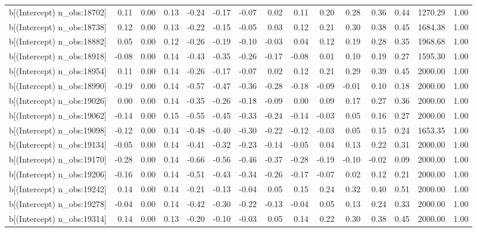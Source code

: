 \begin{table}[ht]
\begin{tabular}{rrrrrrrrrrrrrrr}
  b[(Intercept) n\_obs:18702] & 0.11 & 0.00 & 0.13 & -0.24 & -0.17 & -0.07 & 0.02 & 0.11 & 0.20 & 0.28 & 0.36 & 0.44 & 1270.29 & 1.00 \\ 
  b[(Intercept) n\_obs:18738] & 0.12 & 0.00 & 0.13 & -0.22 & -0.15 & -0.05 & 0.03 & 0.12 & 0.21 & 0.30 & 0.38 & 0.45 & 1684.38 & 1.00 \\ 
  b[(Intercept) n\_obs:18882] & 0.05 & 0.00 & 0.12 & -0.26 & -0.19 & -0.10 & -0.03 & 0.04 & 0.12 & 0.19 & 0.28 & 0.35 & 1968.68 & 1.00 \\ 
  b[(Intercept) n\_obs:18918] & -0.08 & 0.00 & 0.14 & -0.43 & -0.35 & -0.26 & -0.17 & -0.08 & 0.01 & 0.10 & 0.19 & 0.27 & 1595.30 & 1.00 \\ 
  b[(Intercept) n\_obs:18954] & 0.11 & 0.00 & 0.14 & -0.26 & -0.17 & -0.07 & 0.02 & 0.12 & 0.21 & 0.29 & 0.39 & 0.45 & 2000.00 & 1.00 \\ 
  b[(Intercept) n\_obs:18990] & -0.19 & 0.00 & 0.14 & -0.57 & -0.47 & -0.36 & -0.28 & -0.18 & -0.09 & -0.01 & 0.10 & 0.18 & 2000.00 & 1.00 \\ 
  b[(Intercept) n\_obs:19026] & 0.00 & 0.00 & 0.14 & -0.35 & -0.26 & -0.18 & -0.09 & 0.00 & 0.09 & 0.17 & 0.27 & 0.36 & 2000.00 & 1.00 \\ 
  b[(Intercept) n\_obs:19062] & -0.14 & 0.00 & 0.15 & -0.55 & -0.45 & -0.33 & -0.24 & -0.14 & -0.03 & 0.05 & 0.16 & 0.27 & 2000.00 & 1.00 \\ 
  b[(Intercept) n\_obs:19098] & -0.12 & 0.00 & 0.14 & -0.48 & -0.40 & -0.30 & -0.22 & -0.12 & -0.03 & 0.05 & 0.15 & 0.24 & 1653.35 & 1.00 \\ 
  b[(Intercept) n\_obs:19134] & -0.05 & 0.00 & 0.14 & -0.41 & -0.32 & -0.23 & -0.14 & -0.05 & 0.04 & 0.13 & 0.22 & 0.31 & 2000.00 & 1.00 \\ 
  b[(Intercept) n\_obs:19170] & -0.28 & 0.00 & 0.14 & -0.66 & -0.56 & -0.46 & -0.37 & -0.28 & -0.19 & -0.10 & -0.02 & 0.09 & 2000.00 & 1.00 \\ 
  b[(Intercept) n\_obs:19206] & -0.16 & 0.00 & 0.14 & -0.51 & -0.43 & -0.34 & -0.26 & -0.17 & -0.07 & 0.02 & 0.12 & 0.21 & 2000.00 & 1.00 \\ 
  b[(Intercept) n\_obs:19242] & 0.14 & 0.00 & 0.14 & -0.21 & -0.13 & -0.04 & 0.05 & 0.15 & 0.24 & 0.32 & 0.40 & 0.51 & 2000.00 & 1.00 \\ 
  b[(Intercept) n\_obs:19278] & -0.04 & 0.00 & 0.14 & -0.42 & -0.30 & -0.22 & -0.13 & -0.04 & 0.05 & 0.13 & 0.24 & 0.33 & 2000.00 & 1.00 \\ 
  b[(Intercept) n\_obs:19314] & 0.14 & 0.00 & 0.13 & -0.20 & -0.10 & -0.03 & 0.05 & 0.14 & 0.22 & 0.30 & 0.38 & 0.45 & 2000.00 & 1.00 \\ 

\end{tabular}
\end{table}
